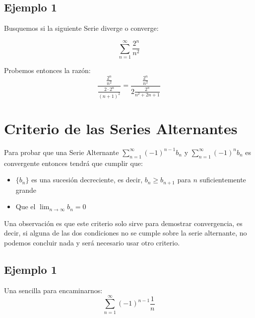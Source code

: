 \documentclass[12pt]{report}							    %
\begin{document}
    \subsection{Ejemplo 1}
    Busquemos si la siguiente Serie diverge o converge:

    \begin{equation*}
        \sum_{n=1}^{\infty} \frac{2^n}{n^2}
    \end{equation*}

    Probemos entonces la razón:
    \begin{equation*}
        \frac{ \frac{2^n}{n^2} }{ \frac{2 \cdot 2^n}{(n+1)^2 } } = \frac{ \frac{2^n}{n^2} }{ 2 \frac{2^n}{n^2 + 2n + 1} }
    \end{equation*}



    \clearpage
    \section{Criterio de las Series Alternantes}

    Para probar que una Serie Alternante $\sum_{n=1}^{\infty} (-1)^{n-1} b_n$ y $\sum_{n=1}^{\infty} (-1)^n b_n$ es convergente entonces tendrá que cumplir que:

    \begin{itemize}
        \item $\{b_n\}$ es una sucesión decreciente, es decir, $b_n \geq b_{n+1}$ para $n$ suficientemente grande
        \item Que el $\lim_{n \to \infty} b_n = 0$
    \end{itemize}

    Una observación es que este criterio solo sirve para demostrar convergencia, es decir, si alguna de las dos condiciones no se cumple sobre la serie alternante, no podemos concluir nada y será necesario usar otro criterio.

    \subsection{Ejemplo 1}
    Una sencilla para encaminarnos:
    \begin{equation*}
        \sum_{n=1}^{\infty} (-1)^{n-1} \frac{1}{n}
    \end{equation*}
\end{document}
